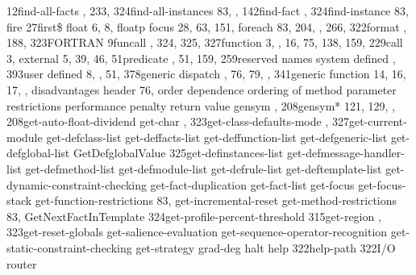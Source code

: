 \documentclass[letterpaper,10pt,english]{sphinxmanual}
\begin{document}
12find-all-facts , 233, 324find-all-instances 83, ,
142find-fact , 324find-instance 83, fire 27first\$
float 6, 8, floatp focus 28, 63, 151,
foreach 83, 204, , 266, 322format , 188,
323FORTRAN 9funcall , 324, 325, 327function 3, , 16, 75,
138, 159, 229call 3, external 5, 39, 46, 51predicate , 51,
159, 259reserved names system defined , 393user defined 8,
, 51, 378generic dispatch , 76, 79, , 341generic
function 14, 16, 17, , disadvantages header 76,
order dependence ordering of method parameter
restrictions performance penalty return value
gensym , 208gensym* 121, 129, ,
208get-auto-float-dividend get-char ,
323get-class-defaults-mode , 327get-current-module
get-defclass-list get-deffacts-list
get-deffunction-list get-defgeneric-list
get-defglobal-list GetDefglobalValue
325get-definstances-list get-defmessage-handler-list
get-defmethod-list get-defmodule-list
get-defrule-list get-deftemplate-list
get-dynamic-constraint-checking get-fact-duplication
get-fact-list get-focus get-focus-stack
get-function-restrictions 83, get-incremental-reset
get-method-restrictions 83, GetNextFactInTemplate
324get-profile-percent-threshold 315get-region ,
323get-reset-globals get-salience-evaluation
get-sequence-operator-recognition
get-static-constraint-checking get-strategy
grad-deg halt help 322help-path 322I/O router
\end{document}

